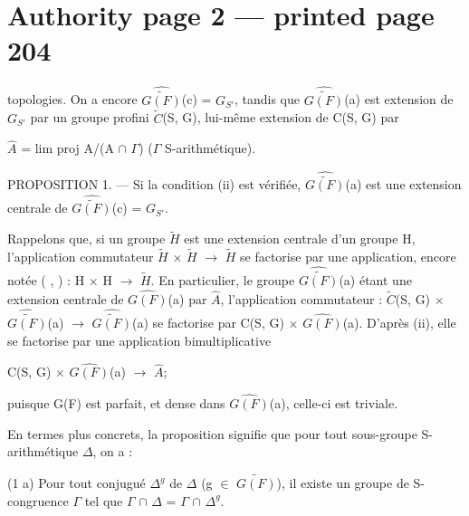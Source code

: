 \documentclass[10pt,a4paper]{article}
\begin{document}
\section*{Authority page 2 --- printed page 204}
\noindent topologies. On a encore \ensuremath{\widehat{\widetilde{G(F)}}}(c) = \ensuremath{G_{S′}}, tandis que \ensuremath{\widehat{\widetilde{G(F)}}}(a) est extension de \ensuremath{G_{S′}} par un groupe profini \ensuremath{\widetilde{C}}(S, G), lui-même extension de C(S, G) par\par
\smallskip
\noindent \ensuremath{\widehat{A}} = lim proj A/(A \ensuremath{∩} \ensuremath{Γ})    (\ensuremath{Γ} S-arithmétique).\par
\smallskip
\noindent PROPOSITION 1. — Si la condition (ii) est vérifiée, \ensuremath{\widehat{\widetilde{G(F)}}}(a) est une extension centrale de \ensuremath{\widehat{\widetilde{G(F)}}}(c) = \ensuremath{G_{S′}}.\par
\smallskip
\noindent Rappelons que, si un groupe \ensuremath{\widetilde{H}} est une extension centrale d'un groupe H, l'application commutateur \ensuremath{\widetilde{H}} \ensuremath{×} \ensuremath{\widetilde{H}} \ensuremath{→} \ensuremath{\widetilde{H}} se factorise par une application, encore notée ( , ) : H \ensuremath{×} H \ensuremath{→} \ensuremath{\widetilde{H}}. En particulier, le groupe \ensuremath{\widehat{\widetilde{G(F)}}}(a) étant une extension centrale de \ensuremath{\widehat{G(F)}}(a) par \ensuremath{\widehat{A}}, l'application commutateur : \ensuremath{\widetilde{C}}(S, G) \ensuremath{×} \ensuremath{\widehat{\widetilde{G(F)}}}(a) \ensuremath{→} \ensuremath{\widehat{\widetilde{G(F)}}}(a) se factorise par C(S, G) \ensuremath{×} \ensuremath{\widehat{G(F)}}(a). D'après (ii), elle se factorise par une application bimultiplicative\par
\smallskip
\noindent C(S, G) \ensuremath{×} \ensuremath{\widehat{G(F)}}(a) \ensuremath{→} \ensuremath{\widehat{A}};\par
\smallskip
\noindent puisque G(F) est parfait, et dense dans \ensuremath{\widehat{G(F)}}(a), celle-ci est triviale.\par
\smallskip
\noindent En termes plus concrets, la proposition signifie que pour tout sous-groupe S-arithmétique \ensuremath{Δ}, on a :\par
\smallskip
\noindent (1 a) Pour tout conjugué \ensuremath{Δ^g} de \ensuremath{Δ} (g \ensuremath{∈} \ensuremath{\widetilde{G(F)}}), il existe un groupe de S-congruence \ensuremath{Γ} tel que \ensuremath{Γ} \ensuremath{∩} \ensuremath{Δ} = \ensuremath{Γ} \ensuremath{∩} \ensuremath{Δ^g}.\par
\end{document}
